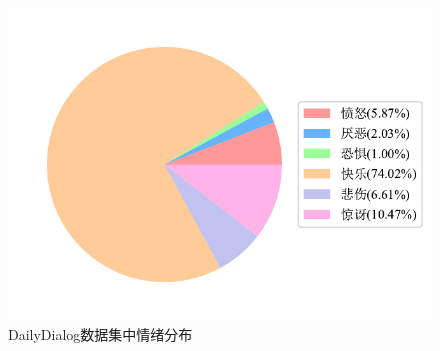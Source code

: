 \begin{figure}[htb]
	\centering
	\includegraphics[width=0.5\linewidth]{images/情绪分布.pdf}
	\caption{DailyDialog数据集中情绪分布}
	\label{fig:EmotionPI}
\end{figure}